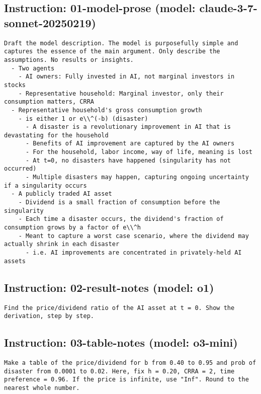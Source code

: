 \subsection*{Instruction: 01-model-prose  (model: claude-3-7-sonnet-20250219)}
\vspace{-1ex}
\begin{lstlisting}[language=text,breaklines=true,frame=single]
Draft the model description. The model is purposefully simple and captures the essence of the main argument. Only describe the assumptions. No results or insights.
  - Two agents
    - AI owners: Fully invested in AI, not marginal investors in stocks
    - Representative household: Marginal investor, only their consumption matters, CRRA
  - Representative household's gross consumption growth
    - is either 1 or e\\^(-b) (disaster)
      - A disaster is a revolutionary improvement in AI that is devastating for the household
      - Benefits of AI improvement are captured by the AI owners
      - For the household, labor income, way of life, meaning is lost 
      - At t=0, no disasters have happened (singularity has not occurred)
      - Multiple disasters may happen, capturing ongoing uncertainty if a singularity occurs
  - A publicly traded AI asset
    - Dividend is a small fraction of consumption before the singularity
    - Each time a disaster occurs, the dividend's fraction of consumption grows by a factor of e\\^h
    - Meant to capture a worst case scenario, where the dividend may actually shrink in each disaster
      - i.e. AI improvements are concentrated in privately-held AI assets

\end{lstlisting}
\vspace{-3ex}
\subsection*{Instruction: 02-result-notes  (model: o1)}
\vspace{-1ex}
\begin{lstlisting}[language=text,breaklines=true,frame=single]
Find the price/dividend ratio of the AI asset at t = 0. Show the derivation, step by step.

\end{lstlisting}
\vspace{-3ex}
\subsection*{Instruction: 03-table-notes  (model: o3-mini)}
\vspace{-1ex}
\begin{lstlisting}[language=text,breaklines=true,frame=single]
Make a table of the price/dividend for b from 0.40 to 0.95 and prob of disaster from 0.0001 to 0.02. Here, fix h = 0.20, CRRA = 2, time preference = 0.96. If the price is infinite, use "Inf". Round to the nearest whole number.

\end{lstlisting}
\vspace{-3ex}
